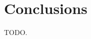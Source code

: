 \documentclass{article}
\begin{document}
\section{Conclusions}

TODO.








\small

\end{document}
